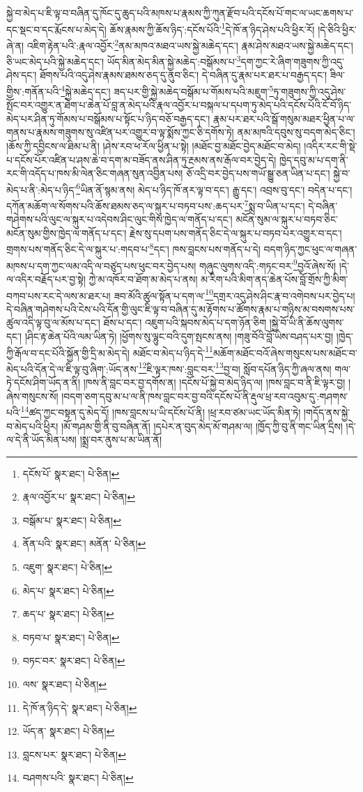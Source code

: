 སྐྱེ་བ་མེད་པ་ཇི་ལྟ་བ་བཞིན་དུ་ཁོང་དུ་ཆུད་པའི་མཁས་པ་རྣམས་ཀྱི་ཀུན་རྫོབ་པའི་དངོས་པོ་གང་ལ་ཡང་ཆགས་པ་དང་སྡང་བ་དང་རྨོངས་པ་མེད་དེ། ཆོས་རྣམས་ཀྱི་ཆོས་ཉིད་:དངོས་པོའི་\footnote{དངོས་པོ་  སྣར་ཐང་།  པེ་ཅིན། }དེ་ཁོ་ན་ཉིད་ཤེས་པའི་ཕྱིར་རོ། །དེ་ཅིའི་ཕྱིར་ཞེ་ན། འཇིག་རྟེན་པའི་:རྣལ་འབྱོར་\footnote{རྣལ་འབྱོར་པ་  སྣར་ཐང་།  པེ་ཅིན། }ནམ་མཁའ་མཐའ་ཡས་སྐྱེ་མཆེད་དང་། རྣམ་ཤེས་མཐའ་ཡས་སྐྱེ་མཆེད་དང་། ཅི་ཡང་མེད་པའི་སྐྱེ་མཆེད་དང་། ཡོད་མིན་མེད་མིན་སྐྱེ་མཆེད་:བསྒོམས་པ་\footnote{བསྒོམ་པ་  སྣར་ཐང་།  པེ་ཅིན། }དག་ཀྱང་རེ་ཞིག་གཟུགས་ཀྱི་འདུ་ཤེས་དང་། ཐོགས་པའི་འདུ་ཤེས་རྣམས་ཐམས་ཅད་དུ་ནུབ་ཅིང་། དེ་བཞིན་དུ་རྣམ་པར་ཐར་པ་བརྒྱད་དང་། ཟིལ་གྱིས་:གནོན་པའི་\footnote{ནོན་པའི་  སྣར་ཐང་། མནོན་  པེ་ཅིན། }སྐྱེ་མཆེད་དང་། ཟད་པར་གྱི་སྐྱེ་མཆེད་བསྒོམ་པ་གོམས་པའི་མཇུག་\footnote{འཇུག་  སྣར་ཐང་།  པེ་ཅིན། }ཏུ་གཟུགས་ཀྱི་འདུ་ཤེས་སྤོང་བར་འགྱུར་ན་ཐེག་པ་ཆེན་པོ་བླ་ན་མེད་པའི་རྣལ་འབྱོར་པ་བསྐལ་པ་དཔག་ཏུ་མེད་པའི་དངོས་པོའི་ངོ་བོ་ཉིད་མེད་པར་ཤིན་ཏུ་གོམས་པ་བསྒོམས་པ་སྟོང་པ་ཉིད་བཅོ་བརྒྱད་དང་། རྣམ་པར་ཐར་པའི་སྒོ་གསུམ་མཐར་ཕྱིན་པ་ལ་གནས་པ་རྣམས་གཟུགས་སུ་འཛིན་པར་འགྱུར་བ་ལྟ་སྨོས་ཀྱང་ཅི་དགོས་ཏེ། ནམ་མཁའི་དབུས་སུ་བདག་མེད་ཅིང་། །ཆོས་ཀྱི་དབྱིངས་ལ་ཐིམ་པ་ནི། །ཤེས་རབ་ཕ་རོལ་ཕྱིན་པ་སྟེ། །མཐོང་བྱ་མཐོང་བྱེད་མཐོང་བ་མེད། །འདིར་རང་གི་སྡེ་པ་དངོས་པོར་འཛིན་པ་ཤས་ཆེ་བ་དག་མ་བཟོད་ནས་ཤིན་ཏུ་རྔམས་ནས་རྒོལ་བར་བྱེད་དེ། ཁྱེད་དབུ་མ་པ་དག་ནི་རང་གི་འདོད་པ་ཁས་མི་ལེན་ཅིང་གཞན་སུན་འབྱིན་པས། ཅོ་འདྲི་བར་བྱེད་པས་གཡོ་སྒྱུ་ཅན་ཡིན་པ་དང་། སྐྱེ་བ་མེད་པ་ནི་:མེད་པ་ཉིད་\footnote{མེད་པ་  སྣར་ཐང་།  པེ་ཅིན། }ཡིན་ནོ་སྙམ་ནས། མེད་པ་ཉིད་ཁོ་ནར་ལྟ་བ་དང་། རྒྱུ་དང་། འབྲས་བུ་དང་། བདེན་པ་དང་། དཀོན་མཆོག་ལ་སོགས་པའི་ཆོས་ཐམས་ཅད་ལ་སྐུར་པ་བཏབ་པས་:ཆད་པར་\footnote{ཆད་པ་  སྣར་ཐང་།  པེ་ཅིན། }སྨྲ་བ་ཡིན་པ་དང་། དེ་བཞིན་གཤེགས་པའི་ལུང་ལ་སྐུར་པ་འདེབས་ཤིང་ལུང་གིས་ཁྱེད་ལ་གནོད་པ་དང་། མངོན་སུམ་ལ་སྐུར་པ་བཏབ་ཅིང་མངོན་སུམ་གྱིས་ཁྱེད་ལ་གནོད་པ་དང་། རྗེས་སུ་དཔག་པས་གནོད་ཅིང་དེ་ལ་སྐུར་པ་བཏབ་པར་འགྱུར་བ་དང་། གྲགས་པས་གནོད་ཅིང་དེ་ལ་སྐུར་པ་:གདབ་པ་\footnote{བཏབ་པ་  སྣར་ཐང་།  པེ་ཅིན། }དང་། ཁས་བླངས་པས་གནོད་པ་དེ། བདག་ཉིད་ཀྱང་ཕུང་ལ་གཞན་མཁས་པ་དག་ཀྱང་ལམ་འདི་ལ་བཙུད་པས་ཕུང་བར་བྱེད་པས། གཞུང་ལུགས་འདི་:གཏང་བར་\footnote{བཏང་བར་  སྣར་ཐང་།  པེ་ཅིན། }བྱའོ་ཞེས་སོ། །དེ་ལ་འདིར་བརྗོད་པར་བྱ་སྟེ། ཀྱེ་མ་འཁོར་བ་ཐོག་མ་མེད་པ་ནས། མ་རིག་པའི་མིག་ནད་ཆེན་པོས་བློ་གྲོས་ཀྱི་མིག་བཀབ་པས་རང་དེ་ལས་མ་ཐར་པ། ཟབ་མོའི་ཚུལ་སྟོན་པ་དག་ལ་\footnote{ལས་  སྣར་ཐང་།  པེ་ཅིན། }དགྲར་འདུ་ཤེས་ཤིང་རྣ་བ་འགེབས་པར་བྱེད་པ། དེ་བཞིན་གཤེགས་པའི་ངེས་པའི་དོན་གྱི་ལུང་ཇི་ལྟ་བ་བཞིན་དུ་མ་རྟོགས་པ་ཚོགས་རྣམ་པ་གཉིས་མ་བསགས་པས་ཚུལ་འདི་ལྟ་བུ་ལ་མོས་པ་དང་། ཐོས་པ་དང་། འཇུག་པའི་སྐབས་མེད་པ་དག་ཉོན་ཅིག །སྐྱེ་བོ་ཡི་ནི་ཆོས་ལུགས་དང་། །ཤིང་རྟ་ཆེན་པོའི་ལམ་ཡིན་ཏེ། །ཕྱོགས་སུ་ལྷུང་བའི་དུག་སྤངས་ནས། །གཟུ་བོའི་བློ་ཡིས་བཤད་པར་བྱ། །ཁྱེད་ཀྱི་རྒོལ་བ་དང་པོའི་སྐྱོན་གྱི་དྲི་མ་མེད་དེ། མཐོང་བ་མེད་པ་ཉིད་དེ་\footnote{དེ་ཁོ་ན་ཉིད་དེ་  སྣར་ཐང་།  པེ་ཅིན། }མཆོག་མཐོང་བའོ་ཞེས་གསུངས་པས་མཐོང་བ་མེད་པའི་དོན་དེ་ལ་ཇི་ལྟ་བུ་ཞིག་:ཡོད་ནས་\footnote{ཡོད་ན་  སྣར་ཐང་།  པེ་ཅིན། }ཇི་ལྟར་ཁས་:བླང་བར་\footnote{བླངས་པར་  སྣར་ཐང་།  པེ་ཅིན། }བྱ་བ། སློབ་དཔོན་ཉིད་ཀྱི་ཞལ་ནས། གལ་ཏེ་དངོས་ཤིག་ཡོད་ན་ནི། །ཁས་ནི་བླང་བར་བྱ་དགོས་ན། །དངོས་པོ་སྐྱེ་བ་མེད་ཉིད་ལ། །ཁས་བླང་བ་ནི་ཇི་ལྟར་བྱ། །ཞེས་གསུངས་སོ། །བདག་ཅག་དབུ་མ་པ་ལ་ནི་ཁས་བླང་བར་བྱ་བའི་དངོས་པོ་ནི་རྡུལ་ཕྲ་རབ་འབུམ་དུ་:གཤགས་པའི་\footnote{བཤགས་པའི་  སྣར་ཐང་།  པེ་ཅིན། }ཚད་ཀྱང་བསྟན་དུ་མེད་དོ། །ཁས་བླངས་པ་ཡི་དངོས་པོ་ནི། །ཕྲ་རབ་ཙམ་ཡང་ཡོད་མིན་ཏེ། །གདོད་ནས་སྐྱེ་བ་མེད་པའི་ཕྱིར། །མོ་གཤམ་གྱི་ནི་བུ་བཞིན་ནོ། །དཔེར་ན་བུད་མེད་མོ་གཤམ་ལ། །ཁྱོད་ཀྱི་བུ་ནི་གང་ཡིན་དྲིས། །དེ་ལ་དེ་ནི་ཡོད་མིན་པས། །སྨྲ་བར་ནུས་པ་མ་ཡིན་ནོ། 